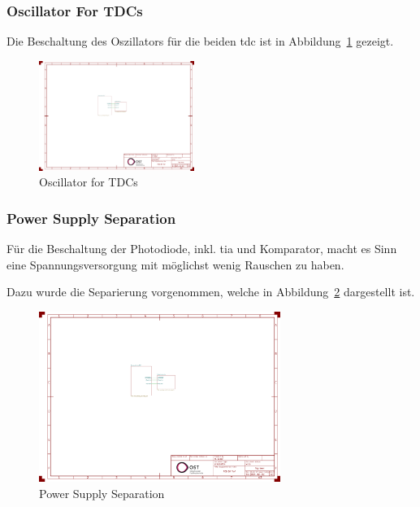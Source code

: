 \documentclass[11pt,a4paper,hidelinks]{article}
\begin{document}
\subsubsection{Oscillator For TDCs}

Die Beschaltung des Oszillators für die beiden \acrshort{tdc} ist in Abbildung~\ref{fig:oscillator_tdc} gezeigt.

\begin{figure}[H]
    \centering
    \includegraphics[page=2, trim=80 90 930 550, clip, width=0.45\textwidth]{attachments/schematic.pdf}
    \caption{Oscillator for TDCs}\label{fig:oscillator_tdc}
\end{figure}

\subsubsection{Power Supply Separation}

Für die Beschaltung der Photodiode, inkl. \acrshort{tia} und Komparator, macht es Sinn eine Spannungsversorgung mit möglichst wenig Rauschen zu haben.

Dazu wurde die Separierung vorgenommen, welche in Abbildung~\ref{fig:power_supply_separation} dargestellt ist.

\begin{figure}[H]
    \centering
    \includegraphics[page=2, trim=260 90 640 550, clip, width=0.7\textwidth]{attachments/schematic.pdf}
    \caption{Power Supply Separation}\label{fig:power_supply_separation}
\end{figure}
\end{document}
